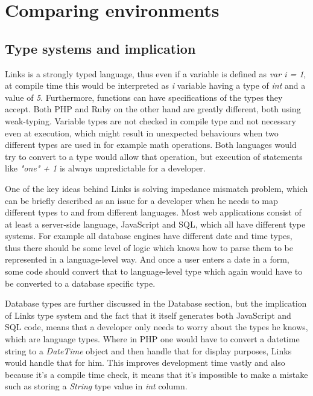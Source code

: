 
\chapter{Comparing environments}

\section{Type systems and implication}

Links is a strongly typed language, thus even if a variable is defined as \textit{var i = 1}, at compile time this would be interpreted as \textit{i} variable having a type of \textit{int} and a value of \textit{5}. Furthermore, functions can have specifications of the types they accept. Both PHP and Ruby on the other hand are greatly different, both using weak-typing. Variable types are not checked in compile type and not necessary even at execution, which might result in unexpected behaviours when two different types are used in for example math operations. Both languages would try to convert to a type would allow that operation, but execution of statements like \textit{"one" + 1} is always unpredictable for a developer.

One of the key ideas behind Links is solving impedance mismatch problem\citep{mismatch}, which can be briefly described as an issue for a developer when he needs to map different types to and from different languages. Most web applications consist of at least a server-side language, JavaScript and SQL, which all have different type systems. For example all database engines have different date and time types, thus there should be some level of logic which knows how to parse them to be represented in a language-level way. And once a user enters a date in a form, some code should convert that to language-level type which again would have to be converted to a database specific type.

Database types are further discussed in the Database section, but the implication of Links type system and the fact that it itself generates both JavaScript and SQL code, means that a developer only needs to worry about the types he knows, which are language types. Where in PHP one would have to convert a datetime string to a \textit{DateTime} object and then handle that for display purposes, Links would handle that for him. This improves development time vastly and also because it's a compile time check, it means that it's impossible to make a mistake such as storing a \textit{String} type value in \textit{int} column.

